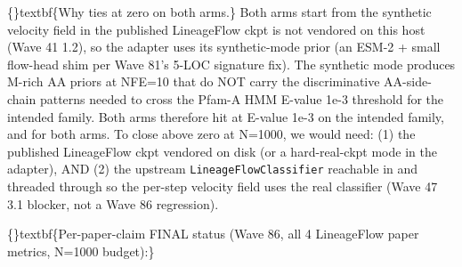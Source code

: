 \documentclass{article}
\begin{document}
\{\}textbf\{Why  ties at zero on both arms.\} Both arms start from the synthetic velocity field in   the published LineageFlow ckpt is not vendored on this host (Wave 41 1.2), so the adapter uses its synthetic-mode prior (an ESM-2 + small flow-head shim per Wave 81's 5-LOC  signature fix). The synthetic mode produces M-rich AA priors at NFE=10 that do NOT carry the discriminative AA-side-chain patterns needed to cross the Pfam-A HMM E-value 1e-3 threshold for the intended family. Both arms therefore hit at E-value  1e-3 on the intended family, and  for both arms. To close  above zero at N=1000, we would need: (1) the published LineageFlow ckpt vendored on disk (or a hard-real-ckpt mode in the adapter), AND (2) the upstream \texttt{LineageFlowClassifier} reachable in  and threaded through  so the per-step velocity field uses the real classifier (Wave 47 3.1 blocker, not a Wave 86 regression).

\{\}textbf\{Per-paper-claim FINAL status (Wave 86, all 4 LineageFlow paper metrics, N=1000 budget):\}
\end{document}
